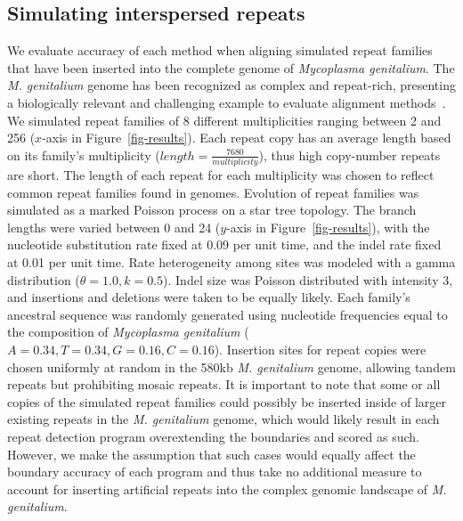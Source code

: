 \documentclass[12pt,journal,draftcls,letterpaper,onecolumn]{IEEEtran}
\begin{document}
\subsection*{Simulating interspersed repeats}
We evaluate accuracy of each method when aligning simulated repeat
families that have been inserted into the complete genome of
\emph{Mycoplasma genitalium}. The \emph{M. genitalium} genome has been recognized
as complex and repeat-rich, presenting a biologically
relevant and challenging example to evaluate alignment
methods~\cite{ref-mycoplasma}. We simulated repeat families of 8
different multiplicities ranging between 2 and 256 ($x$-axis in
Figure~\ref{fig-results}).  Each repeat copy has an average length
based on its family's multiplicity
($length=\frac{7680}{multiplicity}$), thus high copy-number repeats
are short.  The length of each repeat for each multiplicity was chosen
to reflect common repeat families found in genomes. Evolution of repeat families was simulated as a marked
Poisson process on a star tree
topology.  The branch lengths were varied between 0 and 24 ($y$-axis
in Figure~\ref{fig-results}), with the nucleotide substitution rate
fixed at 0.09 per unit time, and the indel rate fixed at 0.01 per
unit time.  Rate heterogeneity among sites was modeled with a gamma
distribution ($\theta = 1.0, k = 0.5$).  Indel size was
Poisson distributed with intensity 3, and insertions and deletions
were taken to be equally likely.  Each family's ancestral
sequence was randomly generated using nucleotide frequencies equal to
the composition of \emph{Mycoplasma genitalium}
($A=0.34,T=0.34,G=0.16,C=0.16$). Insertion sites for repeat copies
were chosen uniformly at random in the 580kb \textit{M. genitalium} genome,
allowing tandem repeats but prohibiting mosaic repeats. It is important to note that some or all copies of the simulated repeat families
could possibly be inserted inside of larger existing repeats in the  \textit{M. genitalium} genome, which would
likely result in each repeat detection program overextending the boundaries and scored as such. However, we make the assumption
that such cases would equally affect the boundary accuracy of each program and thus take no additional measure to account for inserting
artificial repeats into the complex genomic landscape of \textit{M. genitalium}.
\end{document}
